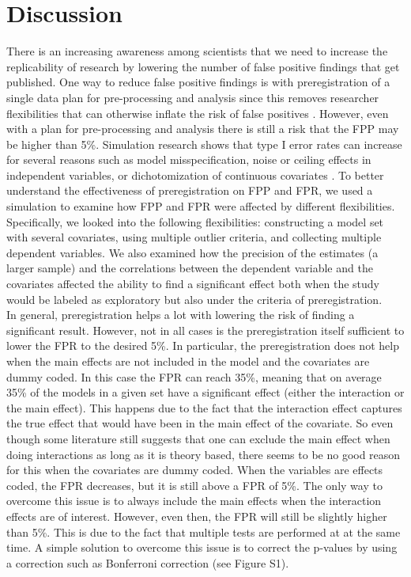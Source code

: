 \section{Discussion}
There is an increasing awareness among scientists that we need to increase the replicability of research by lowering the number of false positive findings that get published. One way to reduce false positive findings is with preregistration of a single data plan for pre-processing and analysis since this removes researcher flexibilities that can otherwise inflate the risk of false positives \citep{Simmons2011}. However, even with a plan for pre-processing and analysis there is still a risk that the FPP may be higher than 5\%. Simulation research shows that type I error rates can increase for several reasons such as model misspecification, noise or ceiling effects in independent variables, or dichotomization of continuous covariates \citep{Dennis2019, Litiere2007, Brunner2009, Austin2003, Austin2004}. To better understand the effectiveness of preregistration on FPP and FPR, we used a simulation to examine how FPP and FPR were affected by different flexibilities. Specifically, we looked into the following flexibilities: constructing a model set with several covariates, using multiple outlier criteria, and collecting multiple dependent variables. We also examined how the precision of the estimates (a larger sample) and the correlations between the dependent variable and the covariates affected the ability to find a significant effect both when the study would be labeled as exploratory but also under the criteria of preregistration. \\

In general, preregistration helps a lot with lowering the risk of finding a significant result. However, not in all cases is the preregistration itself sufficient to lower the FPR to the desired 5\%. In particular, the preregistration does not help when the main effects are not included in the model and the covariates are dummy coded. In this case the FPR can reach 35\%, meaning that on average 35\% of the models in a given set have a significant effect (either the interaction or the main effect). This happens due to the fact that the interaction effect captures the true effect that would have been in the main effect of the covariate. So even though some literature still suggests that one can exclude the main effect when doing interactions as long as it is theory based, there seems to be no good reason for this when the covariates are dummy coded. When the variables are effects coded, the FPR decreases, but it is still above a FPR of 5\%. The only way to overcome this issue is to always include the main effects when the interaction effects are of interest. However, even then, the FPR will still be slightly higher than 5\%. This is due to the fact that multiple tests are performed at at the same time. A simple solution to overcome this issue is to correct the p-values by  using a correction such as Bonferroni correction \citep{dunn1961multiple} (see Figure S1).  \\


